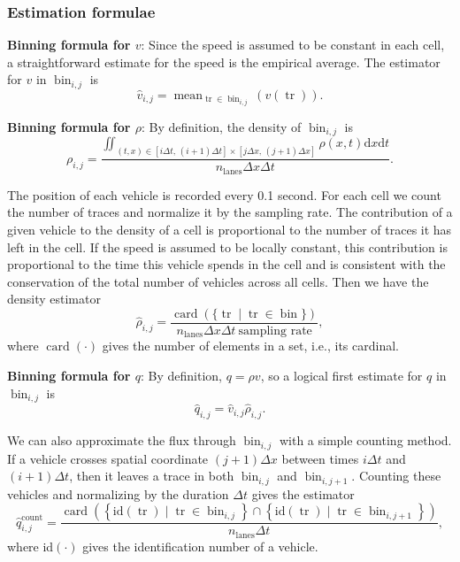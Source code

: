 \documentclass[a4paper, 10pt, conference]{ieeeconf}      %
\DeclareMathOperator{\card}{card}
\DeclareMathOperator{\trc}{tr}
\DeclareMathOperator{\mean}{mean}
\DeclareMathOperator{\bin}{bin}
\DeclareMathOperator{\lns}{lanes}
\DeclareMathOperator{\cnt}{count}
\begin{document}
\subsubsection{Estimation formulae}
\textbf{Binning formula for $v$}: Since the speed is assumed to be constant in each cell, a straightforward estimate for the speed is the empirical average. The estimator for $v$ in $\bin_{i,j}$ is
{\footnotesize
\begin{equation}
\widehat{v}_{i,j}=\mean_{\trc \in \bin_{i,j}}(v(\trc)).
\end{equation}
}

\textbf{Binning formula for $\rho$}: By definition, the density of $\bin_{i,j}$ is  
{\footnotesize
\begin{equation}
\rho_{i,j}=
\frac{
	\iint_{\left(t,x\right)\in [i\Delta t, \,(i+1)\Delta t] \times [j\Delta x,\,(j+1)\Delta x]}\rho(x,t) \text{d}x \text{d}t
}{
	n_{\lns}\Delta x\Delta t
}.
\end{equation}
}

The position of each vehicle is recorded every 0.1 second. For each cell we count the number of traces and normalize it by the sampling rate. The contribution of a given vehicle to the density of a cell is proportional to the number of traces it has left in the cell. If the speed is assumed to be locally constant, this contribution is proportional to the time this vehicle spends in the cell and is consistent with the conservation of the total number of vehicles across all cells. Then we have the density estimator
{\footnotesize
\begin{equation}
\widehat{\rho}_{i,j}=
\frac{
\card ( \{ \trc \mid \trc \in \bin \} )
}{
n_{\lns} \Delta x \Delta t \: \text{sampling rate}
},
\end{equation}
}
where $\card (\cdot)$ gives the number of elements in a set, i.e., its cardinal. 

\textbf{Binning formula for $q$}: By definition, $q=\rho v$, so a logical first estimate for $q$ in $\bin_{i,j}$ is 
{\footnotesize
\begin{equation}
\widehat{q}_{i,j}=\widehat{v}_{i,j}\widehat{\rho}_{i,j}.
\end{equation}
}

We can also approximate the flux through $\bin_{i,j}$ with a simple counting method. If a vehicle crosses spatial coordinate $\left(j+1\right)\Delta x$ between times $i\Delta t$ and $\left(i+1\right)\Delta t$, then it leaves a trace in both $\bin_{i,j}$ and $\bin_{i,j+1}$. Counting these vehicles and normalizing by the duration $\Delta t$ gives the estimator
{\footnotesize
\begin{equation}
\widehat{q}_{i,j}^{\cnt}
=
\frac{
	\card\left(\left\{ \text{id} \left(\trc\right)\mid \trc \in \bin_{i,j}\right\} \cap\left\{ \text{id}\left( \trc \right)\mid \trc\in \bin_{i,j+1}\right\} \right)
}{
	n_{\lns}\Delta t
},
\end{equation}
}
where id$(\cdot)$ gives the identification number of a vehicle.
\end{document}
